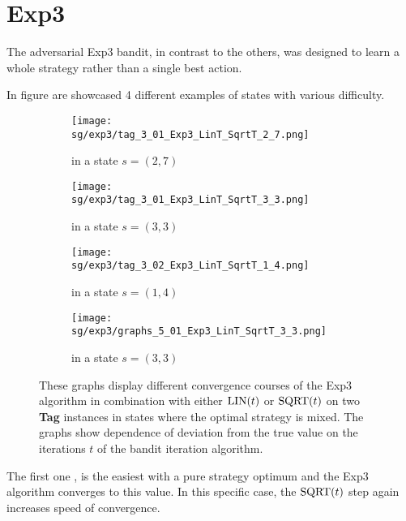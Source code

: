 \documentclass[../main.tex]{subfiles}
\begin{document}
\section{Exp3}\label{apx:sgexp:exp3}
The adversarial Exp3 bandit, in contrast to the others, was designed to learn a whole strategy rather than a single best action.

In figure  are showcased 4 different examples of states with various difficulty.
\begin{figure}[ht]
    \begin{subfigure}[t]{0.45\linewidth}
        \texttt{[image: sg/exp3/tag\_3\_01\_Exp3\_LinT\_SqrtT\_2\_7.png]}
        \caption{ in a state $s = \left(2, 7\right)$}
        \label{apx:sgexp:exp3:fig:tag301:27}
    \end{subfigure}
    \hfill
    \begin{subfigure}[t]{0.45\linewidth}
        \texttt{[image: sg/exp3/tag\_3\_01\_Exp3\_LinT\_SqrtT\_3\_3.png]}
        \caption{ in a state $s = \left(3, 3\right)$}
        \label{apx:sgexp:exp3:fig:tag301:33}
    \end{subfigure}
    \begin{subfigure}[t]{0.45\linewidth}
        \texttt{[image: sg/exp3/tag\_3\_02\_Exp3\_LinT\_SqrtT\_1\_4.png]}
        \caption{ in a state $s = \left(1, 4\right)$}
        \label{apx:sgexp:exp3:fig:tag302:24}
    \end{subfigure}
    \hfill
    \begin{subfigure}[t]{0.45\linewidth}
        \texttt{[image: sg/exp3/graphs\_5\_01\_Exp3\_LinT\_SqrtT\_3\_3.png]}
        \caption{ in a state $s = \left(3, 3\right)$}
        \label{apx:sgexp:exp3:fig:chase:33}
    \end{subfigure}
    \caption[Convergence of the Exp3 algorithm depending on the step functions $\lint$ and $\sqrtt$]{
        These graphs display different convergence courses of the Exp3 algorithm in combination with either $\lint$ or $\sqrtt$ on two \textbf{Tag} instances in states where the optimal strategy is mixed.
        The graphs show dependence of deviation from the true value on the iterations $t$ of the bandit iteration algorithm.
    }
    \label{apx:sgexp:exp3:fig}
\end{figure}
The first one , is the easiest with a pure strategy optimum and the Exp3 algorithm converges to this value.
In this specific case, the $\sqrtt$ step again increases speed of convergence.
\end{document}
